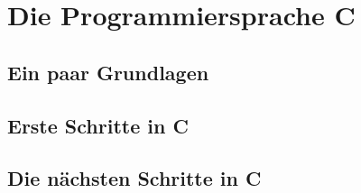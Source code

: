 \mainmatter

\setcounter{page}{1}

\part{Die Programmiersprache C}

\chapter{Ein paar Grundlagen}
\label{sec:grundlagen}




\chapter{Erste Schritte in C}
\label{sec:c}

\newpage
\newpage
\newpage
\newpage
\newpage
\newpage
\newpage
\newpage

\chapter{Die nächsten Schritte in C}
\label{sec:c-aufbau}



